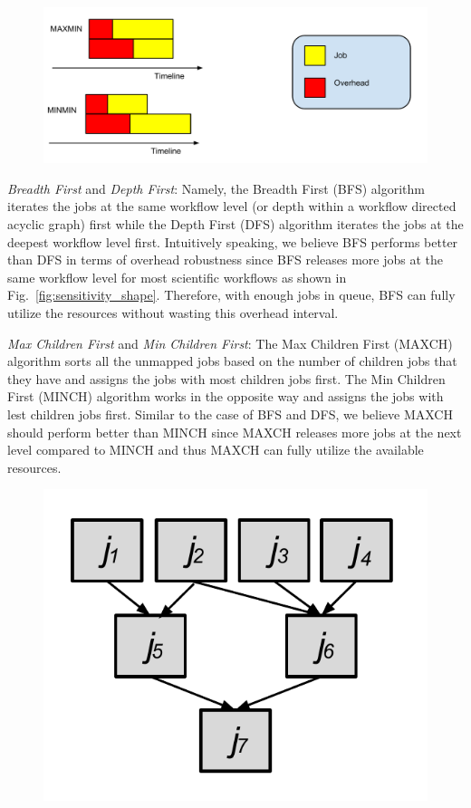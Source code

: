 \begin{figure}[htb]
\centering
 \includegraphics[width=1.0\linewidth]{figures/sensitivity/longest.pdf}
  \label{fig:sensitivity_longest}
\end{figure}
\emph{Breadth First} and \emph{Depth First}: Namely, the Breadth First (BFS) algorithm iterates the jobs at the same workflow level (or depth within a workflow directed acyclic graph) first while the Depth First (DFS) algorithm iterates the jobs at the deepest workflow level first. Intuitively speaking, we believe BFS performs better than DFS in terms of overhead robustness since BFS releases more jobs at the same workflow level for most scientific workflows as shown in Fig.~\ref{fig:sensitivity_shape}. Therefore, with enough jobs in queue, BFS can fully utilize the resources without wasting this overhead interval.  

\emph{Max Children First} and \emph{Min Children First}: The Max Children First (MAXCH) algorithm sorts all the unmapped jobs based on the number of children jobs that they have and assigns the jobs with most children jobs first. The Min Children First (MINCH) algorithm works in the opposite way and assigns the jobs with lest children jobs first. Similar to the case of BFS and DFS, we believe MAXCH should perform better than MINCH since MAXCH releases more jobs at the next level compared to MINCH and thus MAXCH can fully utilize the available resources. 

\begin{figure}[htb]
\centering
 \includegraphics[width=0.5\linewidth]{figures/sensitivity/impact_factor.pdf}
  \label{fig:sensitivity_impact}
\end{figure}

